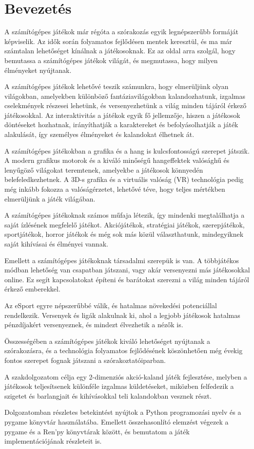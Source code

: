 \chapter{Bevezetés}

A számítógépes játékok már régóta a szórakozás egyik legnépszerűbb formáját képviselik. Az idők során folyamatos fejlődésen mentek keresztül, és ma már számtalan lehetőséget kínálnak a játékosoknak. Ez az oldal arra szolgál, hogy bemutassa a számítógépes játékok világát, és megmutassa, hogy milyen élményeket nyújtanak.

A számítógépes játékok lehetővé teszik számunkra, hogy elmerüljünk olyan világokban, amelyekben különböző fantáziavilágokban kalandozhatunk, izgalmas cselekmények részesei lehetünk, és versenyezhetünk a világ minden tájáról érkező játékosokkal. Az interaktivitás a játékok egyik fő jellemzője, hiszen a játékosok döntéseket hozhatnak, irányíthatják a karaktereket és befolyásolhatják a játék alakulását, így személyes élményeket és kalandokat élhetnek át.

A számítógépes játékokban a grafika és a hang is kulcsfontosságú szerepet játszik. A modern grafikus motorok és a kiváló minőségű hangeffektek valósághű és lenyűgöző világokat teremtenek, amelyekbe a játékosok könnyedén belefeledkezhetnek. A 3D-s grafika és a virtuális valóság (VR) technológia pedig még inkább fokozza a valóságérzetet, lehetővé téve, hogy teljes mértékben elmerüljünk a játék világában.

A számítógépes játékoknak számos műfaja létezik, így mindenki megtalálhatja a saját ízlésének megfelelő játékot. Akciójátékok, stratégiai játékok, szerepjátékok, sportjátékok, horror játékok és még sok más közül választhatunk, mindegyiknek saját kihívásai és élményei vannak.

Emellett a számítógépes játékoknak társadalmi szerepük is van. A többjátékos módban lehetőség van csapatban játszani, vagy akár versenyezni más játékosokkal online. Ez segít kapcsolatokat építeni és barátokat szerezni a világ minden tájáról érkező emberekkel.

Az eSport egyre népszerűbbé válik, és hatalmas növekedési potenciállal rendelkezik. Versenyek és ligák alakulnak ki, ahol a legjobb játékosok hatalmas pénzdíjakért versenyeznek, és mindezt élvezhetik a nézők is.

Összességében a számítógépes játékok kiváló lehetőséget nyújtanak a szórakozásra, és a technológia folyamatos fejlődésének köszönhetően még évekig fontos szerepet fognak játszani a szórakoztatóiparban.

A szakdolgozatom célja egy 2-dimenziós akció-kaland játék fejlesztése, melyben a játékosok teljesítsenek különféle izgalmas küldetéseket, miközben felfedezik a szigetet és barlangjait és kihívásokkal teli kalandokban vesznek részt.

Dolgozatomban részletes betekintést nyújtok a Python programozási nyelv és a pygame könyvtár használatába. Emellett összehasonlító elemzést végezek a pygame és a Ren'py könyvtárak között, és bemutatom a játék implementációjának részleteit is.